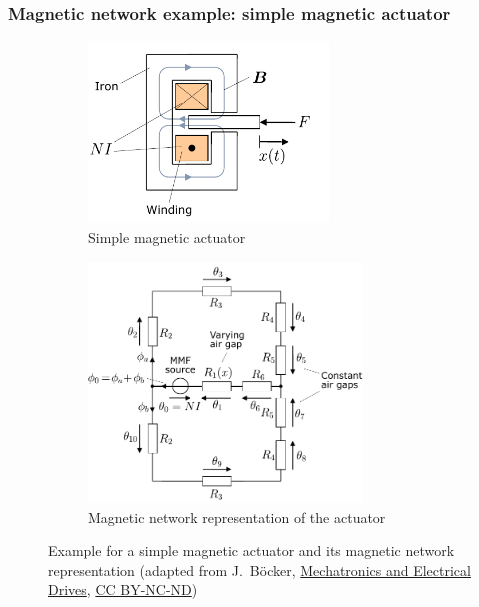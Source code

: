 \begin{frame}
	\frametitle{Magnetic network example: simple magnetic actuator}
    \begin{figure}
		\centering
		\begin{subfigure}[b]{0.49\textwidth}
			\centering
			\includegraphics[width=0.7\textwidth]{fig/lec02/Magnetic_actuator_example.pdf}
            \vspace{0.4cm}
			\caption{Simple magnetic actuator}
		\end{subfigure}
		\hfill
		\begin{subfigure}[b]{0.49\textwidth}
			\centering
			\includegraphics[width=0.8\textwidth]{fig/lec02/Magnetic_actuator_example_reluctance_network.pdf}
			\caption{Magnetic network representation of the actuator}
		\end{subfigure}
		\caption{Example for a simple magnetic actuator and its magnetic network representation (adapted from J.~B\"ocker, \href{https://digital.ub.uni-paderborn.de/doi/10.17619/UNIPB/1-1640}{Mechatronics and Electrical Drives}, \href{https://creativecommons.org/licenses/by-nc-nd/4.0/deed.en}{CC BY-NC-ND})} 
        \label{fig:magnetic_reluctance_network_examples}
	\end{figure}
\end{frame}

